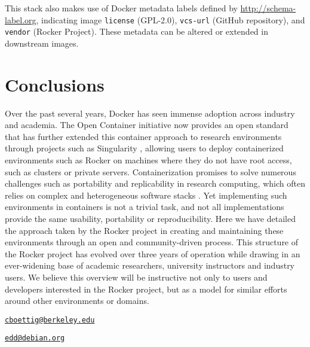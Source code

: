 This stack also makes use of Docker metadata labels defined by
\url{http://schema-label.org}, indicating image \texttt{license}
(GPL-2.0), \texttt{vcs-url} (GitHub repository), and \texttt{vendor}
(Rocker Project). These metadata can be altered or extended in
downstream images.

\section{Conclusions}\label{conclusions}

Over the past several years, Docker has seen immense adoption across
industry and academia. The Open Container initiative \citep{oci} now
provides an open standard that has further extended this container
approach to research environments through projects such as Singularity
\citep{singularity}, allowing users to deploy containerized environments
such as Rocker on machines where they do not have root access, such as
clusters or private servers. Containerization promises to solve numerous
challenges such as portability and replicability in research computing,
which often relies on complex and heterogeneous software stacks
\citep{Boettiger2015}. Yet implementing such environments in containers
is not a trivial task, and not all implementations provide the same
usability, portability or reproducibility. Here we have detailed the
approach taken by the Rocker project in creating and maintaining these
environments through an open and community-driven process. This
structure of the Rocker project has evolved over three years of
operation while drawing in an ever-widening base of academic
researchers, university instructors and industry users. We believe this
overview will be instructive not only to users and developers interested
in the Rocker project, but as a model for similar efforts around other
environments or domains.



\address{%
Carl Boettiger\\
UC Berkeley\\
ESPM Department, University of California,\\ 130 Mulford Hall Berkeley, CA 94720-3114, USA\\
}
\href{mailto:cboettig@berkeley.edu}{\nolinkurl{cboettig@berkeley.edu}}

\address{%
Dirk Eddelbuettel\\
Debian and R Projects; Ketchum Trading\\
Chicago, IL, USA\\
}
\href{mailto:edd@debian.org}{\nolinkurl{edd@debian.org}}

